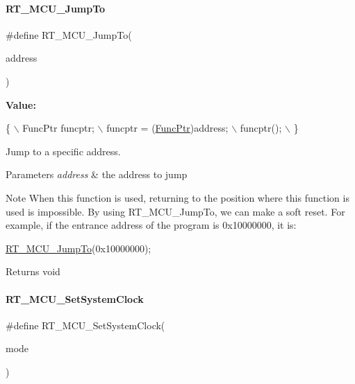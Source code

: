 \paragraph{\texorpdfstring{R\+T\+\_\+\+M\+C\+U\+\_\+\+Jump\+To}{RT\_MCU\_JumpTo}}
{\footnotesize\ttfamily \#define R\+T\+\_\+\+M\+C\+U\+\_\+\+Jump\+To(\begin{DoxyParamCaption}\item[{}]{address }\end{DoxyParamCaption})}

{\bfseries Value\+:}
\begin{DoxyCode}
\{                                   \(\backslash\)
    FuncPtr funcptr;                \(\backslash\)
    funcptr = (\mbox{\hyperlink{a00020_a3d987633d7a3ca10c14905a807b62eb1}{FuncPtr}})address;     \(\backslash\)
    funcptr();                      \(\backslash\)
\}
\end{DoxyCode}


Jump to a specific address. 


\begin{DoxyParams}{Parameters}
{\em address} & the address to jump \\
\hline
\end{DoxyParams}
\begin{DoxyNote}{Note}
When this function is used, returning to the position where this function is used is impossible. By using R\+T\+\_\+\+M\+C\+U\+\_\+\+Jump\+To, we can make a soft reset. For example, if the entrance address of the program is 0x10000000, it is\+: 
\begin{DoxyCode}
\mbox{\hyperlink{a00020_a8c864ced65734e7f17f208d7b532c251}{RT\_MCU\_JumpTo}}(0x10000000);
\end{DoxyCode}
 
\end{DoxyNote}
\begin{DoxyReturn}{Returns}
void 
\end{DoxyReturn}
\mbox{\label{a00020_a017f8665ec51267680fc0e536db19c13}} 
\paragraph{\texorpdfstring{R\+T\+\_\+\+M\+C\+U\+\_\+\+Set\+System\+Clock}{RT\_MCU\_SetSystemClock}}
{\footnotesize\ttfamily \#define R\+T\+\_\+\+M\+C\+U\+\_\+\+Set\+System\+Clock(\begin{DoxyParamCaption}\item[{}]{mode }\end{DoxyParamCaption})}

